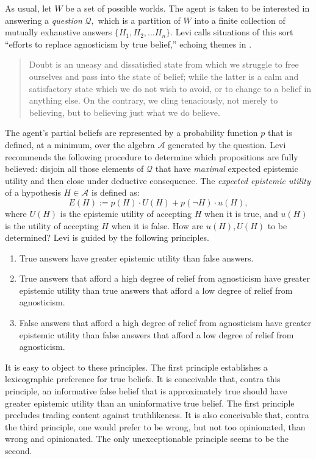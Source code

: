As usual, let $W$ be a set of possible worlds. The agent is taken to be
interested in answering a {\em question} $\mathcal{Q},$ which is a partition of
$W$ into a finite collection of mutually exhaustive answers $\{ H_1, H_2, \ldots
H_n\}.$ Levi calls situations  of this sort ``efforts to replace agnosticism by
true belief,'' echoing themes in \citet{pierce1877fixation}.
\begin{quote}
  Doubt is an uneasy and dissatisfied state from which we struggle to free
  ourselves and pass into the state of belief; while the latter is a calm and
  satisfactory state which we do not wish to avoid, or to change to a belief in
  anything else. On the contrary, we cling tenaciously, not merely to believing,
  but to believing just what we do believe. 
\end{quote} 
The agent's partial beliefs are represented by a probability function $p$ that
is defined, at a minimum, over the algebra $\mathcal{A}$ generated by the
question. Levi recommends the following procedure to determine which
propositions are fully believed: disjoin all those elements of $\mathcal{Q}$
that have {\em maximal} expected epistemic utility and then close under
deductive consequence. The {\em expected epistemic utility} of a hypothesis
$H\in\mathcal{A}$ is defined as: $$ E(H) := p(H)\cdot U(H) + p(\neg H)\cdot
u(H),$$ where $U(H)$ is the epistemic utility of accepting $H$ when it is true,
and $u(H)$ is the utility of accepting $H$ when it is false. How are $u(H),
U(H)$ to be determined? Levi is guided by the following principles.
\begin{enumerate}
  \item True answers have greater epistemic utility than false answers.
  \item True answers that afford a high degree of relief from agnosticism have
  greater epistemic utility than true answers that afford a low  degree of
  relief from agnosticism.
  \item False answers that afford a high degree of relief from agnosticism have
  greater epistemic utility than false answers that afford a low degree of
  relief from agnosticism. 
\end{enumerate}
It is easy to  object to these principles. The first principle establishes a
lexicographic preference for true beliefs. It is conceivable that, contra this
principle, an informative false belief that is approximately true should have
greater epistemic utility than an uninformative true belief. The first principle
precludes trading content against truthlikeness. It is also conceivable that,
contra the third principle, one would prefer to be wrong, but not too
opinionated, than wrong and opinionated. The only unexceptionable principle
seems to be the second. 

